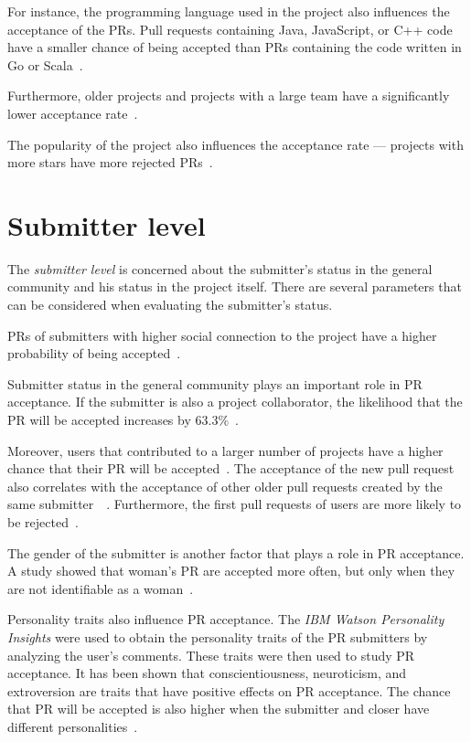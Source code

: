 \documentclass[digital,oneside,oldtable,nolof,nolot,nocover]{fithesis4}
\begin{document}
For instance, the programming language used in the project also influences
the acceptance of the PRs. Pull requests containing Java, JavaScript, or C++
code have a smaller chance of being accepted than PRs containing the code
written in Go or Scala~\cite{factors}.

Furthermore, older projects and projects with a large team have a
significantly lower acceptance rate~\cite{social}.

The popularity of the project also influences the acceptance rate ---
projects with more stars have more rejected PRs~\cite{social}.
\section{Submitter level}
\label{sec:org43af517}
The \emph{submitter level} is concerned about the submitter's status in the
general community and his status in the project itself. There are several
parameters that can be considered when evaluating the submitter's status.

PRs of submitters with higher social connection to the project have a higher
probability of being accepted~\cite{social}.

Submitter status in the general community plays an important role in PR
acceptance. If the submitter is also a project collaborator, the likelihood
that the PR will be accepted increases by 63.3\%~\cite{social}.

Moreover, users that contributed to a larger number of projects have a higher
chance that their PR will be accepted~\cite{npm2}. The acceptance of the new
pull request also correlates with the acceptance of other older pull requests
created by the same submitter~\cite{npm}~\cite{replication}. Furthermore,
the first pull requests of users are more likely to be rejected~\cite{developers}.

The gender of the submitter is another factor that plays a role in PR
acceptance. A study showed that woman's PR are accepted more often, but only
when they are not identifiable as a woman~\cite{gender}.

Personality traits also influence PR acceptance. The \emph{IBM Watson Personality
Insights} were used to obtain the personality traits of the PR submitters by
analyzing the user's comments. These traits were then used to study PR
acceptance. It has been shown that conscientiousness, neuroticism, and
extroversion are traits that have positive effects on PR acceptance. The
chance that PR will be accepted is also higher when the submitter and closer
have different personalities~\cite{personality}.
\end{document}
